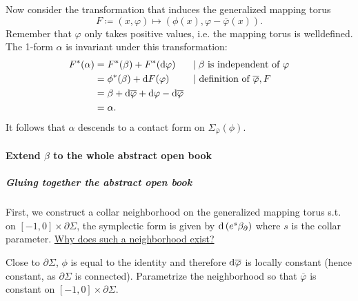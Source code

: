 Now consider the transformation that induces the generalized mapping torus
\[
    F \coloneqq (x,\varphi) \mapsto (\phi(x), \varphi - \overline{\varphi}(x)).    
\]
Remember that $\varphi$ only takes positive values, i.e. the mapping torus is welldefined.
The 1-form $\alpha$ is invariant under this transformation:
\begin{align*}
    F^*(\alpha) &= F^*(\beta) + F^*(\mathrm{d} \varphi)&&|\;\beta\text{ is independent of }\varphi\\
    &= \phi^*(\beta) + \mathrm{d} F(\varphi)&&|\text{ definition of }\overline{\varphi}, F\\
    &= \beta + \mathrm{d}\overline{\varphi} + \mathrm{d} \varphi - \mathrm{d} \overline{\varphi}\\
    &= \alpha.
\end{align*}
It follows that $\alpha$ descends to a contact form on $\Sigma_{\overline{\varphi}}(\phi)$. 

\paragraph*{Extend $\beta$ to the whole abstract open book}
\subparagraph*{Gluing together the abstract open book}
First, we construct a collar neighborhood on the generalized mapping torus s.t. on $[-1,0] \times \partial \Sigma$, the symplectic form is given by $\mathrm{d} \left(e^s\beta_\partial\right)$ where $s$ is the collar parameter. 
\underline{Why does such a neighborhood exist?}

Close to $\partial \Sigma$, $\phi$ is equal to the identity and therefore $\mathrm{d} \overline{\varphi}$ is locally constant (hence constant, as $\partial \Sigma$ is connected).
Parametrize the neighborhood so that $\overline{\varphi}$ is constant on $[-1,0]\times \partial \Sigma$.

